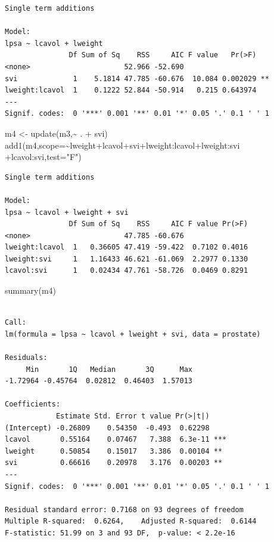 \documentclass[
  dutch,
  letterpaper,
  12pt]{book}
\newenvironment{Shaded}{\begin{snugshade}}{\end{snugshade}}
\newcommand{\AttributeTok}[1]{\textcolor[rgb]{0.40,0.45,0.13}{#1}}
\newcommand{\FunctionTok}[1]{\textcolor[rgb]{0.28,0.35,0.67}{#1}}
\newcommand{\NormalTok}[1]{\textcolor[rgb]{0.00,0.23,0.31}{#1}}
\newcommand{\OtherTok}[1]{\textcolor[rgb]{0.00,0.23,0.31}{#1}}
\newcommand{\SpecialCharTok}[1]{\textcolor[rgb]{0.37,0.37,0.37}{#1}}
\newcommand{\StringTok}[1]{\textcolor[rgb]{0.13,0.47,0.30}{#1}}
\newcounter{none} %
\theoremstyle{definition}
\theoremstyle{definition}
\theoremstyle{definition}
\theoremstyle{remark}
\begin{document}
\begin{verbatim}
Single term additions

Model:
lpsa ~ lcavol + lweight
               Df Sum of Sq    RSS     AIC F value   Pr(>F)   
<none>                      52.966 -52.690                    
svi             1    5.1814 47.785 -60.676  10.084 0.002029 **
lweight:lcavol  1    0.1222 52.844 -50.914   0.215 0.643974   
---
Signif. codes:  0 '***' 0.001 '**' 0.01 '*' 0.05 '.' 0.1 ' ' 1
\end{verbatim}

\begin{Shaded}
\begin{Highlighting}[]
\NormalTok{m4 }\OtherTok{\textless{}{-}} \FunctionTok{update}\NormalTok{(m3,}\SpecialCharTok{\textasciitilde{}}\NormalTok{ . }\SpecialCharTok{+}\NormalTok{ svi)}
\FunctionTok{add1}\NormalTok{(m4,}\AttributeTok{scope=}\SpecialCharTok{\textasciitilde{}}\NormalTok{lweight}\SpecialCharTok{+}\NormalTok{lcavol}\SpecialCharTok{+}\NormalTok{svi}\SpecialCharTok{+}\NormalTok{lweight}\SpecialCharTok{:}\NormalTok{lcavol}\SpecialCharTok{+}\NormalTok{lweight}\SpecialCharTok{:}\NormalTok{svi }\SpecialCharTok{+}\NormalTok{lcavol}\SpecialCharTok{:}\NormalTok{svi,}\AttributeTok{test=}\StringTok{"F"}\NormalTok{)}
\end{Highlighting}
\end{Shaded}

\begin{verbatim}
Single term additions

Model:
lpsa ~ lcavol + lweight + svi
               Df Sum of Sq    RSS     AIC F value Pr(>F)
<none>                      47.785 -60.676               
lweight:lcavol  1   0.36605 47.419 -59.422  0.7102 0.4016
lweight:svi     1   1.16433 46.621 -61.069  2.2977 0.1330
lcavol:svi      1   0.02434 47.761 -58.726  0.0469 0.8291
\end{verbatim}

\begin{Shaded}
\begin{Highlighting}[]
\FunctionTok{summary}\NormalTok{(m4)}
\end{Highlighting}
\end{Shaded}

\begin{verbatim}

Call:
lm(formula = lpsa ~ lcavol + lweight + svi, data = prostate)

Residuals:
     Min       1Q   Median       3Q      Max 
-1.72964 -0.45764  0.02812  0.46403  1.57013 

Coefficients:
            Estimate Std. Error t value Pr(>|t|)    
(Intercept) -0.26809    0.54350  -0.493  0.62298    
lcavol       0.55164    0.07467   7.388  6.3e-11 ***
lweight      0.50854    0.15017   3.386  0.00104 ** 
svi          0.66616    0.20978   3.176  0.00203 ** 
---
Signif. codes:  0 '***' 0.001 '**' 0.01 '*' 0.05 '.' 0.1 ' ' 1

Residual standard error: 0.7168 on 93 degrees of freedom
Multiple R-squared:  0.6264,    Adjusted R-squared:  0.6144 
F-statistic: 51.99 on 3 and 93 DF,  p-value: < 2.2e-16
\end{verbatim}
\end{document}

